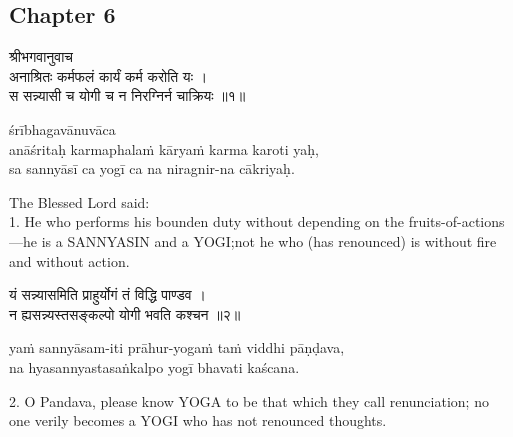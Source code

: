 \chapterdrop

\begin{center}

\headerspace
{}

\section{Chapter 6}

\headerspace
{}

\headerspace
{}

\headerspace
{}

\headerspace
\end{center}

\begin{gitaverse}
श्रीभगवानुवाच \\
अनाश्रितः कर्मफलं कार्यं कर्म करोति यः । \\
स सन्न्यासी च योगी च न निरग्निर्न चाक्रियः ॥१॥
\end{gitaverse}

\begin{transliteration}
śrībhagavānuvāca \\
anāśritaḥ karmaphalaṁ kāryaṁ karma karoti yaḥ, \\
sa sannyāsī ca yogī ca na niragnir-na cākriyaḥ.
\end{transliteration}

The Blessed Lord said: \\
1. He who performs his bounden duty without depending on the
fruits-of-actions---he is a SANNYASIN and a YOGI;\@ not he who (has renounced)
is without fire and without action.

\begin{gitaverse}
यं सन्न्यासमिति प्राहुर्योगं तं विद्धि पाण्डव । \\
न ह्यसन्न्यस्तसङ्कल्पो योगी भवति कश्चन ॥२॥
\end{gitaverse}

\begin{transliteration}
yaṁ sannyāsam-iti prāhur-yogaṁ taṁ viddhi pāṇḍava, \\
na hyasannyastasaṅkalpo yogī bhavati kaścana.
\end{transliteration}

2. O Pandava, please know YOGA to be that which they call renunciation; no one
verily becomes a YOGI who has not renounced thoughts.


